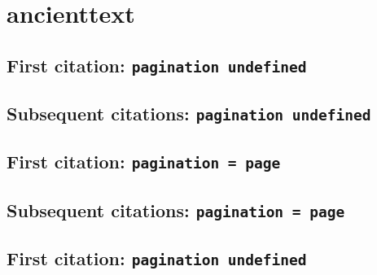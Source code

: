 \documentclass[a4paper]{article}
\begin{document}
\cite{stendahl:1962:a}

\cite[577]{stendahl:1962:a}

\cite[note]{stendahl:1962:a}

\section{ancienttext}

\subsection{First citation: \texttt{pagination undefined}}

\cite{greathymnaten}

\citereset
\cite[44]{greathymnaten}

\citereset
\cite[note]{greathymnaten}

\subsection{Subsequent citations: \texttt{pagination undefined}}

\cite{greathymnaten}

\cite[44]{greathymnaten}

\cite[note]{greathymnaten}

\subsection{First citation: \texttt{pagination = page}}

\cite{greathymnaten:a}

\citereset
\cite[44]{greathymnaten:a}

\citereset
\cite[note]{greathymnaten:a}

\subsection{Subsequent citations: \texttt{pagination = page}}

\cite{greathymnaten:a}

\cite[44]{greathymnaten:a}

\cite[note]{greathymnaten:a}

\subsection{First citation: \texttt{pagination undefined}}

\cite{doomedprince}
\end{document}

